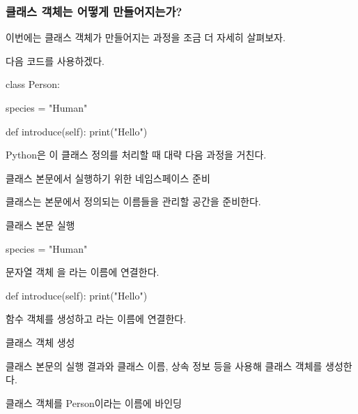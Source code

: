 \subsubsection{클래스 객체는 어떻게 만들어지는가?}

이번에는 클래스 객체가 만들어지는 과정을 조금 더 자세히 살펴보자.

다음 코드를 사용하겠다.

\begin{dhkcode}
class Person:

    species = "Human"

    def introduce(self):
        print("Hello")
\end{dhkcode}

Python은 이 클래스 정의를 처리할 때 대략 다음 과정을 거친다.

\begin{dhknote}
\begin{dhksmry}[centered]
클래스 본문에서 실행하기 위한 네임스페이스 준비
\end{dhksmry}
\end{dhknote}

클래스는 본문에서 정의되는 이름들을 관리할 공간을 준비한다.

\begin{dhknote}
\begin{dhksmry}[centered]
클래스 본문 실행
\end{dhksmry}
\end{dhknote}

\begin{dhkcode}
species = "Human"
\end{dhkcode}

문자열 객체 을 라는 이름에 연결한다.

\begin{dhkcode}
def introduce(self):
    print("Hello")
\end{dhkcode}

함수 객체를 생성하고 라는 이름에 연결한다.

\begin{dhknote}
\begin{dhksmry}[centered]
클래스 객체 생성
\end{dhksmry}
\end{dhknote}

클래스 본문의 실행 결과와 클래스 이름, 상속 정보 등을 사용해 클래스 객체를 생성한다.

\begin{dhknote}
\begin{dhksmry}[centered]
클래스 객체를 Person이라는 이름에 바인딩
\end{dhksmry}
\end{dhknote}

